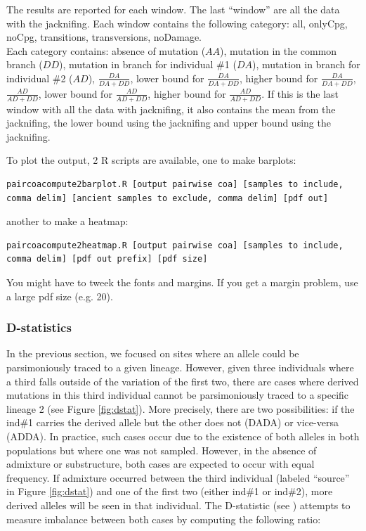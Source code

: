 \documentclass[a4paper]{article}
\begin{document}

The results are reported for each window. The last ``window'' are all the data with the jacknifing. Each window contains the following category: all, onlyCpg, noCpg, transitions, transversions, noDamage.\\

Each category contains: absence of mutation ($AA$), mutation in the common branch ($DD$), mutation in branch for individual \#1 ($DA$), mutation in branch for individual \#2 ($AD$), $\frac { DA} { DA+DD }$, lower bound for $\frac { DA} { DA+DD }$, higher bound for $\frac { DA} { DA+DD }$, $\frac { AD} { AD+DD }$, lower bound for $\frac { AD} { AD+DD }$, higher bound for $\frac { AD} { AD+DD }$. If this is the last window with all the data with jacknifing, it also contains the mean from the jacknifing, the lower bound using the jacknifing and upper bound using the jacknifing.


To plot the output, 2 R scripts are available, one to make barplots:

\begin{lstlisting}
paircoacompute2barplot.R [output pairwise coa] [samples to include, comma delim] [ancient samples to exclude, comma delim] [pdf out]
\end{lstlisting}

another to make a heatmap:
\begin{lstlisting}
paircoacompute2heatmap.R [output pairwise coa] [samples to include, comma delim] [pdf out prefix] [pdf size]
\end{lstlisting}

You might have to tweek the fonts and margins. If you get a margin problem, use a large pdf size (e.g. 20).


\subsubsection{D-statistics}


In the previous section, we focused on sites where an allele could be parsimoniously traced to a given lineage. However, given three individuals where a third falls outside of the variation of the first two, there are cases where derived mutations in this third individual cannot be parsimoniously traced to a specific lineage 2 (see Figure \ref{fig:dstat}). More precisely, there are two possibilities: if the ind\#1 carries the derived allele but the other does not (DADA) or vice-versa (ADDA). In practice, such cases occur due to the existence of both alleles in both populations but where one was not sampled. However, in the absence of admixture or substructure, both cases are expected to occur with equal frequency. If admixture occurred between the third individual (labeled ``source'' in Figure \ref{fig:dstat}) and one of the first two (either ind\#1 or ind\#2), more derived alleles will be seen in that individual. The D-statistic (see \cite{patterson2012ancient}) attempts to measure imbalance between both cases by computing the following ratio:
\end{document}
